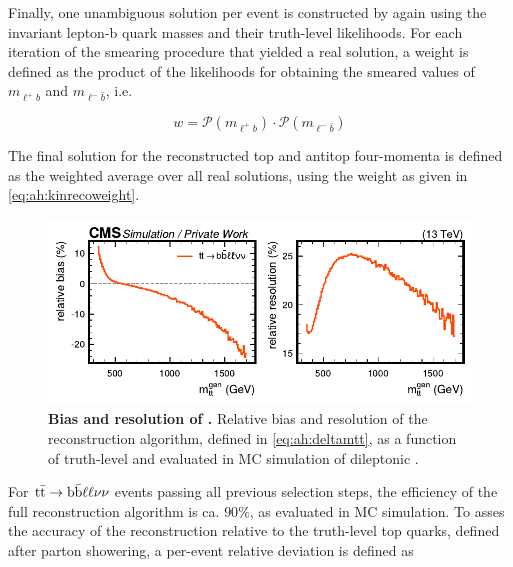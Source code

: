 Finally, one unambiguous solution per event is constructed by again using the invariant lepton-b quark masses and their truth-level likelihoods. 
For each iteration of the smearing procedure that yielded a real solution, a weight is defined as the product of the likelihoods for obtaining the smeared values of $m_{\ell^+ b}$ and $m_{\ell^- \bar{b}}$, i.e.

\begin{equation}
\label{eq:ah:kinrecoweight}
    w = \mathcal{P} (m_{\ell^+ b}) \cdot \mathcal{P} (m_{\ell^- \bar{b}})
\end{equation}

The final solution for the reconstructed top and antitop four-momenta is defined as the weighted average over all real solutions, using the weight as given in \cref{eq:ah:kinrecoweight}.

\begin{figure}[t]
    \centering
    \includegraphics[width=0.99\linewidth]{figures/ah/mtt_resolution.pdf}
    \caption{\textbf{Bias and resolution of \mtt.} Relative bias and resolution of the \ttbar reconstruction algorithm, defined in \cref{eq:ah:deltamtt}, as a function of truth-level \mtt and evaluated in MC simulation of dileptonic \ttbar.}
    \label{fig:ah:resolution}
\end{figure}

For $\mathrm{t \bar{t}} \rightarrow \mathrm{b \bar{b}} \ell \ell \nu \nu$ events passing all previous selection steps, the efficiency of the full reconstruction algorithm is ca. $90\%$, as evaluated in MC simulation. To asses the accuracy of the reconstruction relative to the truth-level top quarks, defined after parton showering, a per-event relative deviation is defined as 

